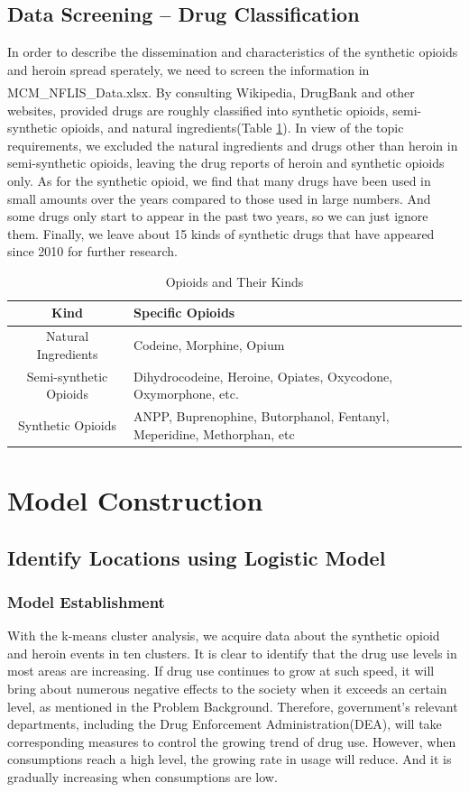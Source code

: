\documentclass[12pt]{article}
\newcommand{\upcite}[1]{\textsuperscript{\textsuperscript{\cite{#1}}}}
\begin{document}
\subsection{Data Screening -- Drug Classification}
In order to describe the dissemination and characteristics of the synthetic opioids and heroin spread sperately, we need to screen the information in MCM\_NFLIS\_Data.xlsx. By consulting Wikipedia, DrugBank\upcite{4} and other websites, provided drugs are roughly classified into synthetic opioids, semi-synthetic opioids, and natural ingredients(Table \ref{opioid kind}). In view of the topic requirements, we excluded the natural ingredients and drugs other than heroin in semi-synthetic opioids, leaving the drug reports of heroin and synthetic opioids only. As for the synthetic opioid, we find that many drugs have been used in small amounts over the years compared to those used in large numbers. And some drugs only start to appear in the past two years, so we can just ignore them. Finally, we leave about 15 kinds of synthetic drugs that have appeared since 2010 for further research.
\begin{table}[H]
	\small
	\centering
	\caption{Opioids and Their Kinds}
	\begin{tabular}{c|l}
	\hline
	Kind & Specific Opioids\\
	\hline
	Natural Ingredients	& Codeine, Morphine, Opium \\
	\hline
	Semi-synthetic Opioids & Dihydrocodeine, Heroine, Opiates, Oxycodone, Oxymorphone, etc.\\
	\hline
	Synthetic Opioids &  ANPP, Buprenophine, Butorphanol, Fentanyl, Meperidine, Methorphan, etc\\
	\hline
	\end{tabular}
	\label{opioid kind}
\end{table}

\section{Model Construction}
\subsection{Identify Locations using Logistic Model}
\subsubsection{Model Establishment}
With the k-means cluster analysis, we acquire data about the synthetic opioid and heroin events in ten clusters. It is clear to identify that the drug use levels in most areas are increasing. If drug use continues to grow at such speed, it will bring about numerous negative effects to the society when it exceeds an certain level, as mentioned in the Problem Background. Therefore, government's relevant departments, including the Drug Enforcement Administration(DEA), will take corresponding measures to control the growing trend of drug use. However, when consumptions reach a high level, the growing rate in usage will reduce. And it is gradually increasing when consumptions are low.
\end{document}
